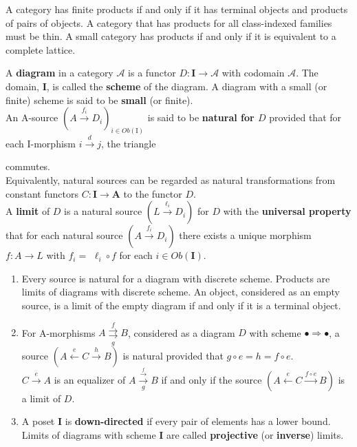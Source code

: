 \begin{prop}
    A category has finite products if and only if it has terminal objects and products of pairs of objects.
    A category that has products for all class-indexed families must be thin.
A small category has products if and only if it is equivalent to a complete lattice.
\end{prop}

A \textbf{diagram} in a category $\mathcal{A}$ is a functor $D: \mathbf{I} \rightarrow \mathcal{A}$ with codomain $\mathcal{A}$. The domain, $\mathbf{I}$, is called the \textbf{scheme} of the diagram. A diagram with a small (or finite) scheme is said to be \textbf{small} (or finite).\\
An A-source $\left(A \xrightarrow{f_i} D_i\right)_{i \in O b(\mathrm{I})}$ is said to be \textbf{natural for $D$} provided that for each I-morphism $i \xrightarrow{d} j$, the triangle 
 commutes.\\
Equivalently, natural sources can be regarded as natural transformations from constant functors $C: \mathbf{I} \rightarrow \mathbf{A}$ to the functor $D$.\\
A \textbf{limit} of $D$ is a natural source $\left(L \xrightarrow{\ell_i} D_i\right)$ for $D$ with the \textbf{universal property} that for each natural source $\left(A \xrightarrow{f_i} D_i\right)$ there exists a unique morphism $f: A \rightarrow L$ with $f_i=$ $\ell_i \circ f$ for each $i \in O b(\mathbf{I})$.

\begin{enumerate}
    \item Every source is natural for a diagram with discrete scheme. Products are limits of diagrams with discrete scheme. An object, considered as an empty source, is a limit of the empty diagram if and only if it is a terminal object.

    \item For A-morphisms $A \underset{g}{\stackrel{f}{\rightrightarrows}} B$, considered as a diagram $D$ with scheme $\bullet \Rightarrow \bullet$, a source $(A \stackrel{e}{\longleftarrow} C \xrightarrow{h} B)$ is natural provided that $g \circ e=h=f \circ e$.\\
    $C \xrightarrow{e} A$ is an equalizer of $A \xrightarrow[g]{\stackrel{f}{\longrightarrow}} B$ if and only if the source $(A \stackrel{e}{\leftarrow} C \xrightarrow{f \circ e} B)$ is a limit of $D$. 

    \item A poset $\mathbf{I}$ is \textbf{down-directed} if every pair of elements has a lower bound. Limits of diagrams with scheme $\mathbf{I}$ are called \textbf{projective} (or \textbf{inverse}) limits. 
\end{enumerate}

